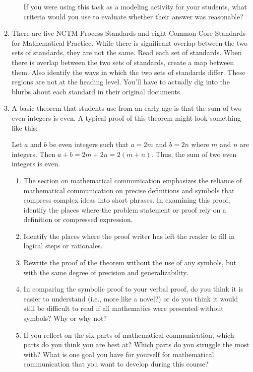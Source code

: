 \documentclass[
]{book}
\theoremstyle{definition}
\theoremstyle{definition}
\theoremstyle{definition}
\theoremstyle{remark}
\begin{document}
\begin{enumerate}
\begin{enumerate}
    If you were using this task as a modeling activity for your students, what criteria would you use to evaluate whether their answer was reasonable?
  \end{enumerate}
\item
  There are five NCTM Process Standards and eight Common Core Standards for Mathematical Practice. While there is significant overlap between the two sets of standards, they are not the same. Read each set of standards. When there is overlap between the two sets of standards, create a map between them. Also identify the ways in which the two sets of standards differ. These regions are not at the heading level. You'll have to actually dig into the blurbs about each standard in their original documents.
\item
  A basic theorem that students use from an early age is that the sum of two even integers is even. A typical proof of this theorem might look something like this:

  Let \(a\) and \(b\) be even integers such that \(a=2m\) and \(b=2n\) where \(m\) and \(n\) are integers. Then \(a+b=2m+2n=2(m+n)\). Thus, the sum of two even integers is even.

  \begin{enumerate}
  \def\labelenumii{\alph{enumii})}
  \item
    The section on mathematical communication emphasizes the reliance of mathematical communication on precise definitions and symbols that compress complex ideas into short phrases. In examining this proof, identify the places where the problem statement or proof rely on a definition or compressed expression.
  \item
    Identify the places where the proof writer has left the reader to fill in logical steps or rationales.
  \item
    Rewrite the proof of the theorem without the use of any symbols, but with the same degree of precision and generalizability.
  \item
    In comparing the symbolic proof to your verbal proof, do you think it is easier to understand (i.e., more like a novel?) or do you think it would still be difficult to read if all mathematics were presented without symbols? Why or why not?
  \item
    If you reflect on the six parts of mathematical communication, which parts do you think you are best at? Which parts do you struggle the most with? What is one goal you have for yourself for mathematical communication that you want to develop during this course?
  \end{enumerate}
\end{enumerate}
\end{document}
